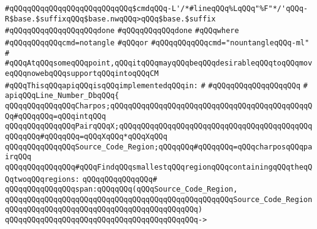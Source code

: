 \verb|#qQQqqQQqqQQqqQQqqQQqqQQqqQQq$cmdqQQq-L'/*#lineqQQq%LqQQq"%F"*/'qQQq-R$base.$suffixqQQq$base.nwqQQq>qQQq$base.$suffix|\newline
\verb|#qQQqqQQqqQQqqQQqqQQqdone|\newline
\verb|#qQQqqQQqqQQqdone|\newline
\verb|#qQQqwhere|\newline
\verb|#qQQqqQQqqQQqcmd=notangle|\newline
\verb|#qQQqor|\newline
\verb|#qQQqqQQqqQQqcmd="nountangleqQQq-ml"|\newline
\verb|#|\newline
\verb|#qQQqAtqQQqsomeqQQqpoint,qQQqitqQQqmayqQQqbeqQQqdesirableqQQqtoqQQqmoveqQQqnowebqQQqsupportqQQqintoqQQqCM|\newline
\newline
\newline
\verb|#qQQqThisqQQqapiqQQqisqQQqimplementedqQQqin:|\newline
\verb|#|\newline
\verb|#qQQqqQQqqQQqqQQqqQQq|\newline
\verb|#|\newline
\verb|apiqQQqLine_Number_DbqQQq{|\newline
\newline
\verb|qQQqqQQqqQQqqQQqCharpos;qQQqqQQqqQQqqQQqqQQqqQQqqQQqqQQqqQQqqQQqqQQqqQQq#qQQqqQQq=qQQqintqQQq|\newline
\verb|qQQqqQQqqQQqqQQqPairqQQqX;qQQqqQQqqQQqqQQqqQQqqQQqqQQqqQQqqQQqqQQqqQQqqQQqqQQq#qQQqqQQq=qQQqXqQQq*qQQqXqQQq|\newline
\newline
\verb|qQQqqQQqqQQqqQQqSource_Code_Region;qQQqqQQq#qQQqqQQq=qQQqcharposqQQqpairqQQq|\newline
\newline
\verb|qQQqqQQqqQQqqQQq#qQQqFindqQQqsmallestqQQqregionqQQqcontainingqQQqtheqQQqtwoqQQqregions:|\newline
\verb|qQQqqQQqqQQqqQQq#|\newline
\verb|qQQqqQQqqQQqqQQqspan:qQQqqQQq(qQQqSource_Code_Region,|\newline
\verb|qQQqqQQqqQQqqQQqqQQqqQQqqQQqqQQqqQQqqQQqqQQqqQQqqQQqSource_Code_Region|\newline
\verb|qQQqqQQqqQQqqQQqqQQqqQQqqQQqqQQqqQQqqQQqqQQq)|\newline
\verb|qQQqqQQqqQQqqQQqqQQqqQQqqQQqqQQqqQQqqQQqqQQq->|\newline
